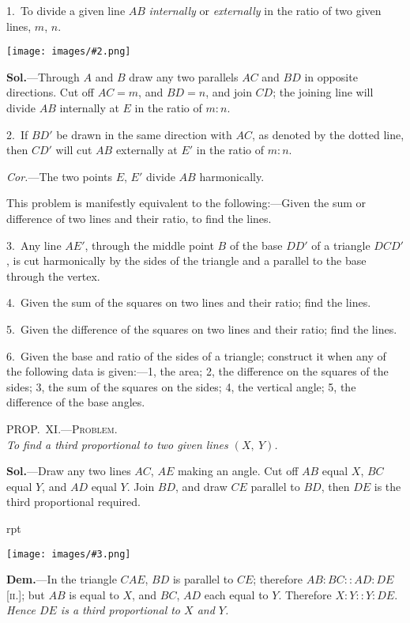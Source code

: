 \documentclass[oneside]{book}
\newcounter{wrapwidth}
\newcommand\myprop[2]{
\bigskip\Needspace*{4\baselineskip}\begin{center}\textsc{#1}\\\medskip\emph{#2}\par\end{center}
}
\newcommand\imgflow[3]{
\setcounter{wrapwidth}{#1}
\begin{wrapfigure}[#2]{r}{\value{wrapwidth}pt}
\begin{center}
\vspace{-0.3in}
\texttt{[image: images/\#3.png]}
\end{center}
\end{wrapfigure}
}
\newcommand\imgcent[2]{
\begin{center}
\texttt{[image: images/\#2.png]}
\end{center}
}
\begin{document}
\begin{footnotesize}
1.~To divide a given line $AB$ \emph{internally} or \emph{externally} in the
ratio of two given lines, $m$, $n$.

\imgcent{250}{f179}

\textbf{Sol.}---Through $A$ and $B$ draw any two parallels $AC$ and $BD$ in
opposite directions. Cut off $AC = m$, and $BD = n$, and join
$CD$; the joining line will divide $AB$ internally at $E$ in the ratio
of $m : n$.

2.~If $BD'$ be drawn in the same direction with $AC$, as denoted
by the dotted line, then $CD'$ will cut $AB$ externally at $E'$ in the
ratio of $m : n$.

\emph{Cor.}---The two points $E$, $E'$ divide $AB$ harmonically.

This problem is manifestly equivalent to the following:---Given
the sum or difference of two lines and their ratio, to find
the lines.

3.~Any line $AE'$, through the middle point $B$ of the base $DD'$
of a triangle $DCD'$, is cut harmonically by the sides of the
triangle and a parallel to the base through the vertex.

4.~Given the sum of the squares on two lines and their ratio;
find the lines.

5.~Given the difference of the squares on two lines and their
ratio; find the lines.

6.~Given the base and ratio of the sides of a triangle; construct
it when any of the following data is given:---1, the area;
2, the difference on the squares of the sides; 3, the sum of the
squares on the sides; 4, the vertical angle; 5, the difference of
the base angles.
\par\end{footnotesize}

\myprop{PROP\@.~XI\@.---Problem.}{To find a third proportional\index{Proportionals!third} to two given lines $(X,\ Y)$.}

\textbf{Sol.}---Draw any two lines $AC$, $AE$ making an angle.
Cut off $AB$ equal $X$, $BC$ equal $Y$, and $AD$ equal $Y$.
Join $BD$, and draw $CE$ parallel to $BD$, then $DE$ is the
third proportional required.


\imgflow{175}{7}{f180}

\textbf{Dem.}---In the triangle $CAE$, $BD$ is parallel to
$CE$; therefore $AB : BC
:: AD : DE$ [\textsc{ii.}]; but
$AB$ is equal to $X$, and
$BC$, $AD$ each equal to
$Y$. Therefore $X : Y
:: Y : DE$. \textit{Hence $DE$
is a third proportional to $X$ and $Y$.}
\end{document}
